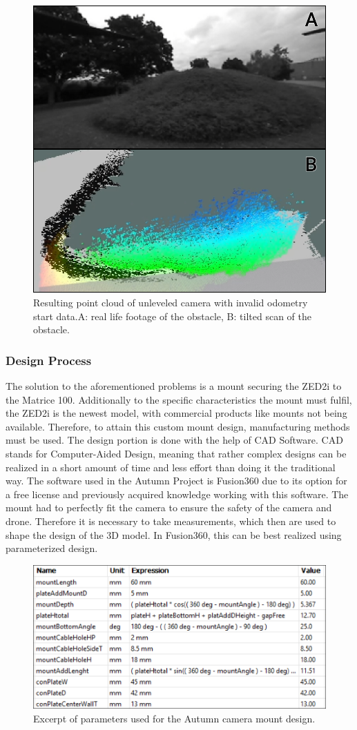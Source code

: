 \begin{figure}[h]
	\centering
	\includegraphics[width=0.5\linewidth]{img/MisalignedOdom}
	\caption{Resulting point cloud of unleveled camera with invalid odometry start data.\newline A: real life footage of the obstacle, B: tilted scan of the obstacle.}
	\label{fig:custom_parts_misalignedOdom}
\end{figure}

\subsubsection{Design Process}

The solution to the aforementioned problems is a mount securing the ZED2i to the Matrice 100. Additionally to the specific characteristics the mount must fulfil, the ZED2i is the newest model, with commercial products like mounts not being available. Therefore, to attain this custom mount design, manufacturing methods must be used. 
The design portion is done with the help of CAD Software. CAD stands for Computer-Aided Design, meaning that rather complex designs can be realized in a short amount of time and less effort than doing it the traditional way. The software used in the Autumn Project is Fusion360 due to its option for a free license and previously acquired knowledge working with this software. 
The mount had to perfectly fit the camera to ensure the safety of the camera and drone. Therefore it is necessary to take measurements, which then are used to shape the design of the 3D model. In Fusion360, this can be best realized using parameterized design.

\begin{figure}[h]
	\centering
	\includegraphics[width=0.7\linewidth]{img/Parameter}
	\caption{Excerpt of parameters used for the Autumn camera mount design.}
	\label{fig:custom_parts_parameter}
\end{figure}

